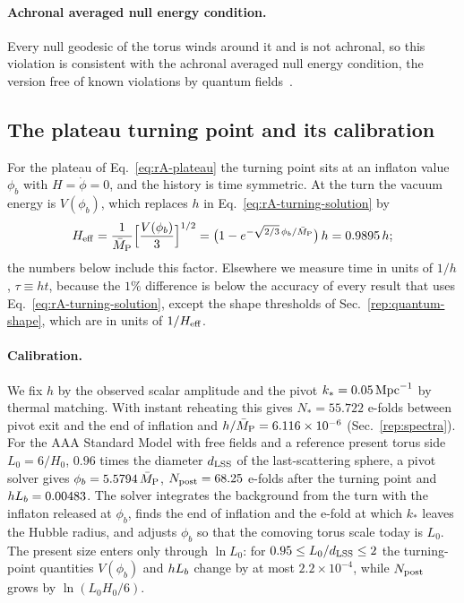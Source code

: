 \paragraph{Achronal averaged null energy condition.}
Every null geodesic of the torus winds around it and is not achronal, so this violation is consistent with the achronal averaged null energy condition, the version free of known violations by quantum fields~\cite{Graham:2007va}.

\subsection{The plateau turning point and its calibration}
\label{rA:turn-plateau}

For the plateau of Eq.~\eqref{eq:rA-plateau} the turning point sits at an inflaton value $\phi_b$ with $H=\dot\phi=0$, and the history is time symmetric.
At the turn the vacuum energy is $V(\phi_b)$, which replaces $h$ in Eq.~\eqref{eq:rA-turning-solution} by
\begin{equation}
H_{\mathrm{eff}}=\frac{1}{\bar M_{\mathrm{P}}}\Big[\frac{V(\phi_b)}{3}\Big]^{1/2}=\big(1-e^{-\sqrt{2/3}\,\phi_b/\bar M_{\mathrm{P}}}\big)\,h=0.9895\,h ;
\label{eq:rA-Heff}
\end{equation} %
the numbers below include this factor.
Elsewhere we measure time in units of $1/h$, $\tau\equiv ht$, because the $1\%$ difference is below the accuracy of every result that uses Eq.~\eqref{eq:rA-turning-solution}, except the shape thresholds of Sec.~\ref{rep:quantum-shape}, which are in units of $1/H_{\mathrm{eff}}$.

\paragraph{Calibration.}
We fix $h$ by the observed scalar amplitude and the pivot $k_*=0.05\,{\rm Mpc}^{-1}$ by thermal matching. %
With instant reheating this gives $N_*=55.722$ e-folds between pivot exit and the end of inflation and $h/\bar M_{\mathrm{P}}=6.116\times10^{-6}$ (Sec.~\ref{rep:spectra}). %
For the AAA Standard Model with free fields and a reference present torus side $L_0=6/H_0$, $0.96$ times the diameter $d_{\mathrm{LSS}}$ of the last-scattering sphere, a pivot solver gives $\phi_b=5.5794\,\bar M_{\mathrm{P}}$, $N_{\rm post}=68.25$ e-folds after the turning point and $hL_b=0.00483$. %
The solver integrates the background from the turn with the inflaton released at $\phi_b$, finds the end of inflation and the e-fold at which $k_*$ leaves the Hubble radius, and adjusts $\phi_b$ so that the comoving torus scale today is $L_0$.
The present size enters only through $\ln L_0$: for $0.95\leq L_0/d_{\mathrm{LSS}}\leq2$ the turning-point quantities $V(\phi_b)$ and $hL_b$ change by at most $2.2\times10^{-4}$, while $N_{\rm post}$ grows by $\ln(L_0H_0/6)$. %


